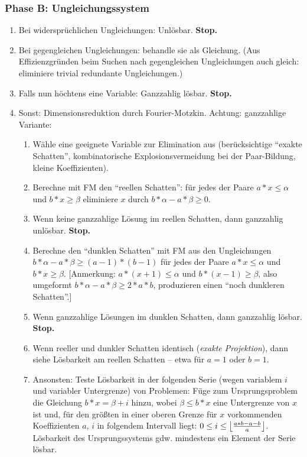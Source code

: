 \subsubsection{Phase B: Ungleichungssystem}
\begin{enumerate}
\setcounter{enumi}{\theenumTemp}
\item Bei widersprüchlichen Ungleichungen: Unlösbar. \textbf{Stop.}
\item Bei gegengleichen Ungleichungen: behandle sie als Gleichung.
  (Aus Effizienzgründen beim Suchen nach gegengleichen Ungleichungen
  auch gleich: eliminiere trivial redundante Ungleichungen.)
\item Falls nun höchtens eine Variable: Ganzzahlig lösbar. \textbf{Stop.}
\item Sonst: Dimensionsreduktion durch Fourier-Motzkin. Achtung:
  ganzzahlige Variante:
  \begin{enumerate}
  \item Wähle eine geeignete Variable zur Elimination aus
    (berücksichtige ``exakte Schatten'', kombinatorische
    Explosionsvermeidung bei der Paar-Bildung, kleine Koeffizienten).
  \item Berechne mit FM den ``reellen Schatten'': für jedes der Paare
    $a*x\leq \alpha$ und $b*x\geq \beta$ eliminiere $x$ durch $b*\alpha - a*\beta \geq 0$.
  \item Wenn keine ganzzahlige Lösung im reellen Schatten, dann
      ganzzahlig unlösbar. \textbf{Stop.}
  \item Berechne den ``dunklen Schatten'' mit FM aus den Ungleichungen
    $b*\alpha - a*\beta \geq (a\!-\!1)*(b\!-\!1)$ für jedes der Paare
    $a*x\leq \alpha$ und $b*x\geq \beta$. [Anmerkung: $a*(x\!+\!1)\leq \alpha$ und
    $b*(x\!-\!1)\geq \beta$, also umgeformt $b*\alpha - a*\beta \geq 2*a*b$,
    produzieren einen ``noch dunkleren Schatten''.]
  \item Wenn ganzzahlige Lösungen im dunklen Schatten, dann ganzzahlig
    lösbar. \textbf{Stop.}
  \item Wenn reeller und dunkler Schatten identisch (\emph{exakte
      Projektion}), dann siehe Lösbarkeit am reellen Schatten -- etwa
    für $a=1$ oder $b=1$.
  \item Ansonsten: Teste Lösbarkeit in der folgenden Serie (wegen
    variablem $i$ und variabler Untergrenze) von Problemen: Füge zum
    Ursprungsproblem die Gleichung $b*x=\beta + i$ hinzu, wobei
    $\beta\leq b*x$ eine Untergrenze von $x$ ist und, für den
    größten in einer oberen Grenze für $x$ vorkommenden Koeffizienten
    $a$, $i$ in folgendem Intervall liegt: $0\leq i\leq
    \left\lfloor{a*b-a-b\over a}\right\rfloor$.  Lösbarkeit des
    Ursprungssystems gdw. mindestens ein Element der Serie lösbar.
  \end{enumerate}
\end{enumerate}

